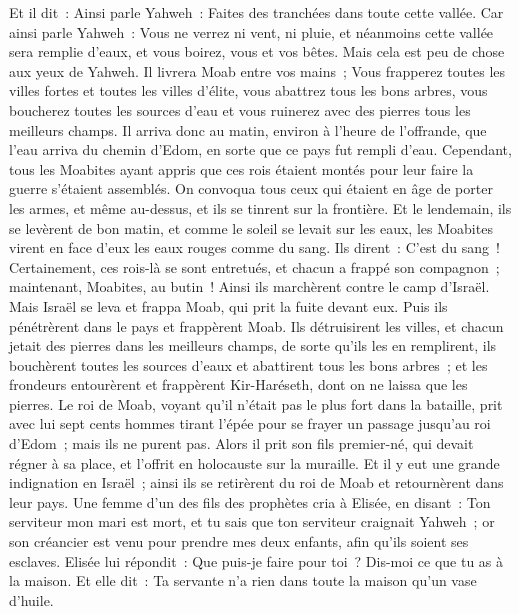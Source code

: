 \begin{multicols}{2}
Et il dit~: Ainsi parle Yahweh~: Faites des tranchées dans toute cette vallée.
Car ainsi parle Yahweh~: Vous ne verrez ni vent, ni pluie, et néanmoins cette vallée sera remplie d'eaux, et vous boirez, vous et vos bêtes.
Mais cela est peu de chose aux yeux de Yahweh. Il livrera Moab entre vos mains~;
Vous frapperez toutes les villes fortes et toutes les villes d'élite, vous abattrez tous les bons arbres, vous boucherez toutes les sources d'eau et vous ruinerez avec des pierres tous les meilleurs champs.
Il arriva donc au matin, environ à l'heure de l'offrande, que l'eau arriva du chemin d'Edom, en sorte que ce pays fut rempli d'eau.
Cependant, tous les Moabites ayant appris que ces rois étaient montés pour leur faire la guerre s'étaient assemblés. On convoqua tous ceux qui étaient en âge de porter les armes, et même au-dessus, et ils se tinrent sur la frontière.
Et le lendemain, ils se levèrent de bon matin, et comme le soleil se levait sur les eaux, les Moabites virent en face d'eux les eaux rouges comme du sang.
Ils dirent~: C'est du sang~! Certainement, ces rois-là se sont entretués, et chacun a frappé son compagnon~; maintenant, Moabites, au butin~!
Ainsi ils marchèrent contre le camp d'Israël. Mais Israël se leva et frappa Moab, qui prit la fuite devant eux. Puis ils pénétrèrent dans le pays et frappèrent Moab.
Ils détruisirent les villes, et chacun jetait des pierres dans les meilleurs champs, de sorte qu'ils les en remplirent, ils bouchèrent toutes les sources d'eaux et abattirent tous les bons arbres~; et les frondeurs entourèrent et frappèrent Kir-Haréseth, dont on ne laissa que les pierres.
Le roi de Moab, voyant qu'il n'était pas le plus fort dans la bataille, prit avec lui sept cents hommes tirant l'épée pour se frayer un passage jusqu'au roi d'Edom~; mais ils ne purent pas.
Alors il prit son fils premier-né, qui devait régner à sa place, et l'offrit en holocauste sur la muraille. Et il y eut une grande indignation en Israël~; ainsi ils se retirèrent du roi de Moab et retournèrent dans leur pays.
\VerseOne{}Une femme d'un des fils des prophètes cria à Elisée, en disant~: Ton serviteur mon mari est mort, et tu sais que ton serviteur craignait Yahweh~; or son créancier est venu pour prendre mes deux enfants, afin qu'ils soient ses esclaves.
Elisée lui répondit~: Que puis-je faire pour toi~? Dis-moi ce que tu as à la maison. Et elle dit~: Ta servante n'a rien dans toute la maison qu'un vase d'huile.

\end{multicols}
